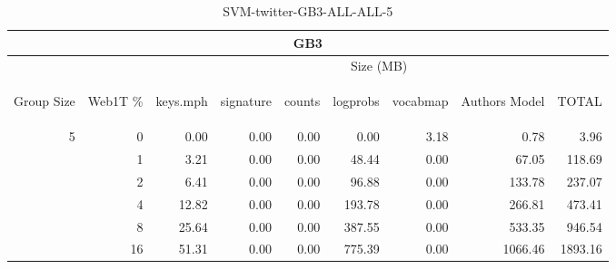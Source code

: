 \begin{center}
\begin{table}[htbp] 
 \begin{center}
\begin{tabular}{ | r | r | r | r | r | r | r | r | r |}
\hline
\multicolumn{9}{|c|}{GB3}\\
\hline
 & & \multicolumn{7}{|c|}{Size (MB)}\\ \cline{3-9}
\begin{sideways}Group Size\end{sideways} & \begin{sideways}Web1T \% \end{sideways} & \begin{sideways}keys.mph\end{sideways} & \begin{sideways}signature\end{sideways} & \begin{sideways}counts\end{sideways} & \begin{sideways}logprobs\end{sideways} & \begin{sideways}vocabmap\end{sideways} & \begin{sideways}Authors Model \end{sideways} & \begin{sideways}TOTAL\end{sideways}\\
\hline
\multirow{5}{*}{5}
 & 0 & 0.00 & 0.00 & 0.00 & 0.00 & 3.18 & 0.78 & 3.96\\ \cline{2-9}
 & 1 & 3.21 & 0.00 & 0.00 & 48.44 & 0.00 & 67.05 & 118.69\\ \cline{2-9}
 & 2 & 6.41 & 0.00 & 0.00 & 96.88 & 0.00 & 133.78 & 237.07\\ \cline{2-9}
 & 4 & 12.82 & 0.00 & 0.00 & 193.78 & 0.00 & 266.81 & 473.41\\ \cline{2-9}
 & 8 & 25.64 & 0.00 & 0.00 & 387.55 & 0.00 & 533.35 & 946.54\\ \cline{2-9}
 & 16 & 51.31 & 0.00 & 0.00 & 775.39 & 0.00 & 1066.46 & 1893.16\\ \cline{2-9}
\hline
\end{tabular}
\caption{SVM-twitter-GB3-ALL-ALL-5}
\label{table:SVM-twitter-GB3-ALL-ALL-5}
\end{center}
 \end{table}
\end{center}


